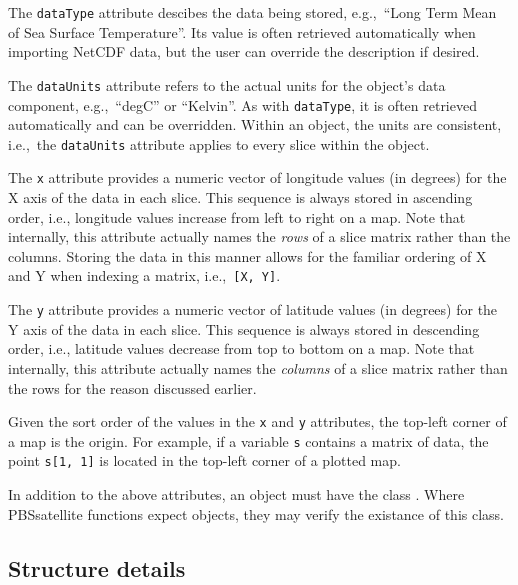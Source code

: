 \documentclass[11pt]{report}
\begin{document}
The \texttt{dataType} attribute descibes the data being stored, e.g.,~``Long Term Mean of Sea Surface Temperature''.
Its value is often retrieved automatically when importing NetCDF data, but the user can override the description if desired.

The \texttt{dataUnits} attribute refers to the actual units for the object's data component, e.g.,~``degC'' or ``Kelvin''.
As with \texttt{dataType}, it is often retrieved automatically and can be overridden.
Within an  object, the units are consistent, i.e.,~the \texttt{dataUnits} attribute applies to every slice within the object.

The \texttt{x} attribute provides a numeric vector of longitude values (in degrees) for the X axis of the data in each slice.
This sequence is always stored in ascending order, i.e., longitude values increase from left to right on a map.
Note that internally, this attribute actually names the \textit{rows} of a slice matrix rather than the columns.
Storing the data in this manner allows for the familiar ordering of X and Y when indexing a matrix, i.e.,~\verb+[X, Y]+.

The \texttt{y} attribute provides a numeric vector of latitude values (in degrees) for the Y axis of the data in each slice.
This sequence is always stored in descending order, i.e., latitude values decrease from top to bottom on a map.
Note that internally, this attribute actually names the \textit{columns} of a slice matrix rather than the rows for the reason discussed earlier.

Given the sort order of the values in the \texttt{x} and \texttt{y} attributes, the top-left corner of a map is the origin.
For example, if a variable \texttt{s} contains a matrix of data, the point \verb+s[1, 1]+ is located in the top-left corner of a plotted map.

In addition to the above attributes, an  object must have the class .
Where PBSsatellite functions expect  objects, they may verify the existance of this class.

\subsection{Structure details}
\end{document}
